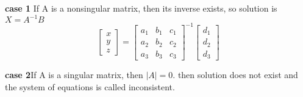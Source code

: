 \documentclass[12pt]{article}
\begin{document}
\textbf{case 1} If A is a nonsingular matrix, then its inverse exists, so solution is $X=A^{-1}B$
$$\begin{bmatrix}
    x \\
    y \\
    z
\end{bmatrix}=\begin{bmatrix}
    a_1 & b_1 & c_1 \\
    a_2 & b_2 & c_2 \\
    a_3 & b_3 & c_3 
\end{bmatrix}^{-1} \begin{bmatrix}
    d_1 \\
    d_2 \\
    d_3
\end{bmatrix}$$

\textbf{case 2}If A is a singular matrix, then $| A | = 0$. then solution does not exist and the
system of equations is called inconsistent.
\end{document}
